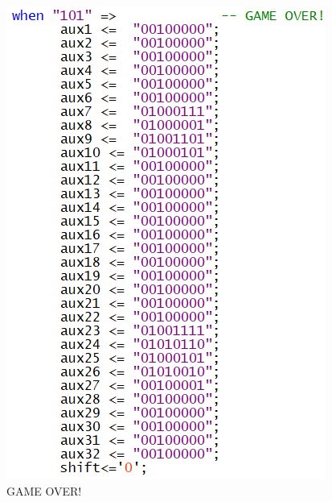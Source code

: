 \documentclass[14pt, oneside]{book}
\theoremstyle{definition}
\begin{document}
                \begin{figure}[H]
                    \centering
                    \includegraphics[scale=1]{lcdexample6.png}
                    \caption{GAME OVER!}
                    \label{lcdexample6}
                \end{figure}
                
\end{document}
